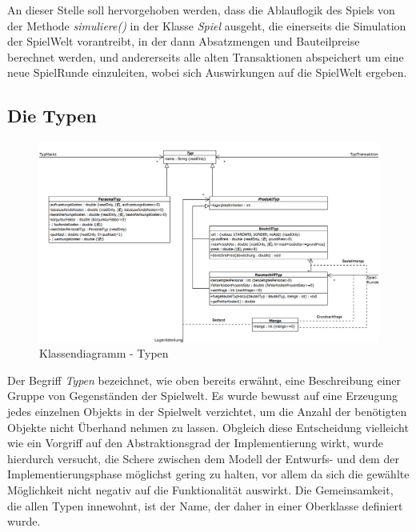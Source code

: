 An dieser Stelle soll hervorgehoben werden, dass die Ablauflogik des Spiels von der Methode \textit{simuliere()} in der Klasse \textit{Spiel} ausgeht, die einerseits die Simulation der SpielWelt vorantreibt, in der dann Absatzmengen und Bauteilpreise berechnet werden, und andererseits alle alten Transaktionen abspeichert um eine neue SpielRunde einzuleiten, wobei sich Auswirkungen auf die SpielWelt ergeben.

\subsection{Die Typen}
\begin{figure}[ht]
     \centering
     \includegraphics[width=\textwidth]{30_Fachkonzept/20_Entwurf/typ}
     \caption{Klassendiagramm - Typen}
     \label{img:fachkonzept-entwurf-typ}
\end{figure}

Der Begriff \textit{Typen} bezeichnet, wie oben bereits erwähnt, eine Beschreibung einer Gruppe von Gegenständen der Spielwelt. Es wurde bewusst auf eine Erzeugung jedes einzelnen Objekts in der Spielwelt verzichtet, um die Anzahl der benötigten Objekte nicht Überhand nehmen zu lassen. Obgleich diese Entscheidung vielleicht wie ein Vorgriff auf den Abstraktionsgrad der Implementierung wirkt, wurde hierdurch versucht, die Schere zwischen dem Modell der Entwurfs- und dem der Implementierungsphase möglichst gering zu halten, vor allem da sich die gewählte Möglichkeit nicht negativ auf die Funktionalität auswirkt. Die Gemeinsamkeit, die allen Typen innewohnt, ist der Name, der daher in einer Oberklasse definiert wurde.

